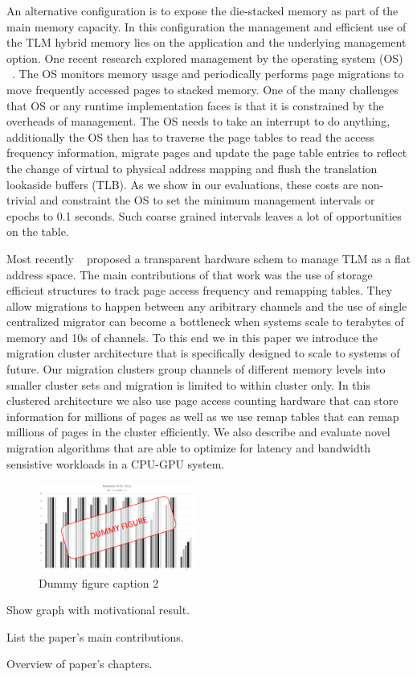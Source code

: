 An alternative configuration is to expose the die-stacked memory as part of the main memory capacity. In this configuration the management and efficient use of the TLM hybrid memory lies on the application and the underlying management option. One recent research explored  management by the operating system (OS) ~\cite{meswani-hpca21}. The OS monitors memory usage and periodically performs page migrations to move frequently accessed pages to stacked memory. 
One of the many challenges that OS or any runtime implementation faces is that it is constrained by the overheads of management. The OS needs to take an interrupt to do anything, additionally the OS then has to traverse the page tables to read the access frequency information,  migrate pages and update the page table entries to reflect the change of virtual to physical address mapping and flush the translation lookaside buffers (TLB). As we show in our evaluations, these costs are non-trivial and constraint the OS to set the minimum management intervals or epochs to 0.1 seconds. Such coarse grained intervals leaves a lot of opportunities on the table. 

Most recently ~\cite{sim-micro2014} proposed a transparent hardware schem to manage TLM as a flat address space. The main contributions of that work was the use of storage efficient structures to track page access frequency and remapping tables. They allow migrations to happen between any aribitrary channels and the use of single centralized migrator can become a bottleneck when systems scale to terabytes of memory and 10s of channels. To this end we in this paper we introduce  the migration cluster architecture that is specifically designed to scale to systems of future. Our migration clusters group channels of different memory levels into smaller cluster sets and migration is limited to within cluster only. In this clustered architecture we also use page access counting hardware that can store information for millions of pages as well as we use remap tables that can remap millions of pages in the cluster efficiently. We also describe and evaluate novel migration algorithms that are able to optimize for latency and bandwidth sensistive workloads in a CPU-GPU system. 

\begin{figure}[h]
  \includegraphics[width=0.46\textwidth]{figures/dummy.pdf}
  \caption{Dummy figure caption 2}
  \label{fig:dummy2}
\end{figure}





Show graph with motivational result.

List the paper's main contributions.

Overview of paper's chapters.
